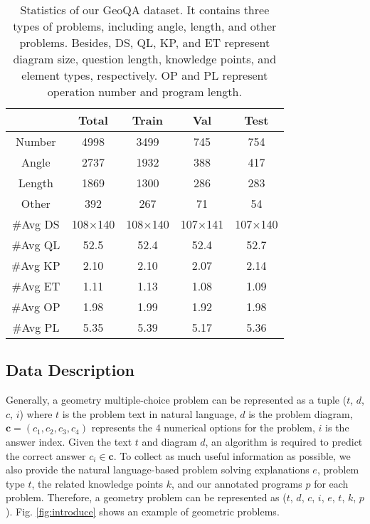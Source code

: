 \documentclass[11pt,a4paper]{article}
\begin{document}
\begin{table}[tbp]
\centering
\resizebox{1.0\linewidth}{!} {
\begin{tabular}{c|c|c|c|c}
\hline
& Total & Train & Val & Test \\
\hline
\hline
Number & 4998 & 3499 & 745 & 754 \\
\hline
Angle & 2737 & 1932 & 388 & 417\\
Length & 1869 & 1300 & 286 & 283\\
Other & 392 & 267 & 71 & 54\\
\hline
\#Avg DS & 108$\times$140 & 108$\times$140 & 107$\times$141 & 107$\times$140\\
\#Avg QL & 52.5 & 52.4 & 52.4 & 52.7\\
\#Avg KP & 2.10 & 2.10 & 2.07 & 2.14\\
\#Avg ET & 1.11 & 1.13 & 1.08 & 1.09\\
\hline
\#Avg OP & 1.98 & 1.99 & 1.92 & 1.98\\
\#Avg PL & 5.35 & 5.39 & 5.17 & 5.36\\
\hline
\end{tabular}
}
\caption{Statistics of our GeoQA dataset. It contains three types of problems, including angle, length, and other problems. Besides, DS, QL, KP, and ET represent diagram size, question length, knowledge points, and element types, respectively. OP and PL represent operation number and program length.
}
\label{table-dataset}
\end{table}

\subsection{Data Description}
 Generally, a geometry multiple-choice problem can be represented as a tuple ($t$, $d$, $c$, $i$) where $t$ is the problem text in natural language, $d$ is the problem diagram, $\mathbf{c}=(c_1,c_2,c_3,c_4)$ represents the 4 numerical options for the problem, $i$ is the answer index. Given the text $t$ and diagram $d$, an algorithm is required to predict the correct answer $c_i \in \mathbf{c}$. To collect as much useful information as possible, we also provide the natural language-based problem solving explanations $e$, problem type $t$, the related knowledge points $k$, and our annotated programs $p$ for each problem. Therefore, a geometry problem can be represented as ($t$, $d$, $c$, $i$, $e$, $t$, $k$, $p$). Fig. \ref{fig:introduce} shows an example of geometric problems.
 
\end{document}
